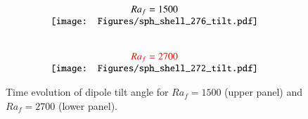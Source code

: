 \begin{figure}[ht]
\begin{center}
\[
\begin{array}{c}
Ra_f = 1500  \\
\texttt{[image: Figures/sph\_shell\_276\_tilt.pdf]} \\
\\
\\
{\color{red}Ra_f = 2700}\\
\texttt{[image: Figures/sph\_shell\_272\_tilt.pdf]} \\
\end{array}
\]
\end{center}
\caption{
Time evolution of dipole tilt angle for $Ra_f = 1500$ (upper panel) and 
$Ra_f = 2700$
(lower panel).
}
\label{Fig:more_cases}
\end{figure}
